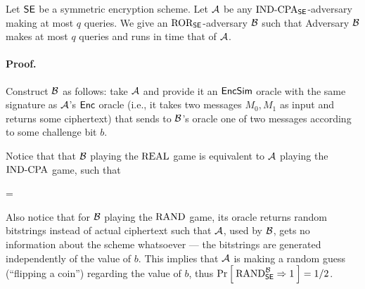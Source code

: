 \begin{theorem}
Let ${\mathsf{SE}}$ be a symmetric encryption scheme. Let ${\mathcal A}$ be any
$\textnormal{IND-CPA}_{\mathsf{SE}}$-adversary making at most $q$ queries. 
We give an $\textnormal{ROR}_{\mathsf{SE}}$-adversary ${\mathcal B}$ such that
\bnm
  \AdvINDCPA{\SE}{\advA} \cdotsm\AdvROR{\SE}{\advB}
\enm
Adversary ${\mathcal B}$ makes at most $q$ 
queries and runs in time that of ${\mathcal A}$.
\end{theorem}

%

\paragraph{Proof.}

Construct ${\mathcal B}$ as follows: take ${\mathcal A}$ and provide it an $\textsf{EncSim}$
oracle with the same signature as ${\mathcal A}$'s $\textsf{Enc}$ oracle (i.e., it takes two
messages $M_0, M_1$ as input and returns some ciphertext) that sends to
${\mathcal B}$'s oracle one of two messages according to some challenge bit $b$.


Notice that that ${\mathcal B}$ playing the $\textnormal{REAL}$ game is equivalent to 
${\mathcal A}$ playing the $\textnormal{IND-CPA}$ game, such that

\bnm
{} =
\Prob{\INDCPA_{\SEscheme}^{\advA} \Rightarrow \true}
\enm

Also notice that for ${\mathcal B}$ playing the $\textnormal{RAND}$ game, its oracle returns
random bitstrings instead of actual ciphertext such that ${\mathcal A}$, used by
${\mathcal B}$, gets no information about the scheme whatsoever --- the bitstrings
are generated independently of the value of $b$. This implies that ${\mathcal A}$
is making a random guess (``flipping a coin'') regarding the value of $b$,
thus $\Pr\left[\: \textnormal{RAND}_{\textnormal{\textsf{SE}}}^{{\mathcal B}} \Rightarrow 1 \:\right] = 1/2$.

